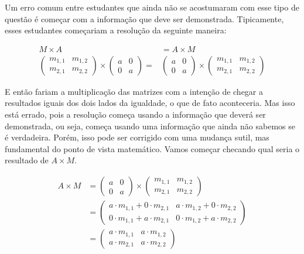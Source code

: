 \documentclass[main_estudante.tex]{subfiles}
\begin{document}
Um erro comum entre estudantes que ainda não se acostumaram com esse tipo de questão é começar com a informação que deve ser demonstrada. Tipicamente, esses estudantes começariam a resolução da seguinte maneira:

\begin{equation*}\begin{align}
M \times A & = A \times M  \\
\begin{pmatrix}m_{1,1} & m_{1,2} \\ m_{2,1} & m_{2,2}\end{pmatrix} \times \begin{pmatrix}a & 0 \\ 0 & a\end{pmatrix} = {} & \begin{pmatrix}a & 0 \\ 0 & a\end{pmatrix} \times \begin{pmatrix}m_{1,1} & m_{1,2} \\ m_{2,1} & m_{2,2}\end{pmatrix}
\end{align}\end{equation*}

E então fariam a multiplicação das matrizes com a intenção de chegar a resultados iguais dos dois lados da igualdade, o que de fato aconteceria. Mas isso está errado, pois a resolução começa usando a informação que deverá ser demonstrada, ou seja, começa usando uma informação que ainda não sabemos se é verdadeira. Porém, isso pode ser corrigido com uma mudança sutil, mas fundamental do ponto de vista matemático. Vamos começar checando qual seria o resultado de $A \times M$.

\begin{equation*}\begin{align}
A \times M & {} = \begin{pmatrix}a & 0 \\ 0 & a\end{pmatrix} \times \begin{pmatrix}m_{1,1} & m_{1,2} \\ m_{2,1} & m_{2,2}\end{pmatrix} \\
& {} = \begin{pmatrix}a \cdot m_{1,1} + 0 \cdot m_{2,1} & a \cdot m_{1,2} + 0 \cdot m_{2,2} \\  0 \cdot m_{1,1} + a \cdot m_{2,1} & 0 \cdot m_{1,2} + a \cdot m_{2,2}\end{pmatrix} \\
& {} = \begin{pmatrix}a \cdot m_{1,1} & a \cdot m_{1,2} \\ a \cdot m_{2,1} & a \cdot m_{2,2}\end{pmatrix}
\end{align}\end{equation*}
\end{document}

